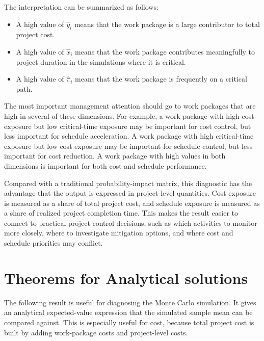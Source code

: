 \documentclass[11pt,a4paper]{article}
\newcommand{\1}{\mathbf{1}}
\theoremstyle{definition}
\theoremstyle{plain}
\theoremstyle{remark}
\numberwithin{equation}{section}
\begin{document}
The interpretation can be summarized as follows:

\begin{itemize}
    \item A high value of $\widehat y_i$ means that the work package is a large contributor to total project cost.
    \item A high value of $\widehat x_i$ means that the work package contributes meaningfully to project duration in the simulations where it is critical.
    \item A high value of $\widehat\pi_i$ means that the work package is frequently on a critical path.
\end{itemize}

The most important management attention should go to work packages that are high in several of these dimensions. For example, a work package with high cost exposure but low critical-time exposure may be important for cost control, but less important for schedule acceleration. A work package with high critical-time exposure but low cost exposure may be important for schedule control, but less important for cost reduction. A work package with high values in both dimensions is important for both cost and schedule performance.

Compared with a traditional probability-impact matrix, this diagnostic has the advantage that the output is expressed in project-level quantities. Cost exposure is measured as a share of total project cost, and schedule exposure is measured as a share of realized project completion time. This makes the result easier to connect to practical project-control decisions, such as which activities to monitor more closely, where to investigate mitigation options, and where cost and schedule priorities may conflict.
 
\newpage
\printbibliography

\newpage
\appendix


\section{Theorems for Analytical solutions}

The following result is useful for diagnosing the Monte Carlo simulation. It gives an analytical expected-value expression that the simulated sample mean can be compared against. This is especially useful for cost, because total project cost is built by adding work-package costs and project-level costs.
\end{document}
